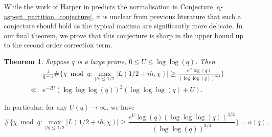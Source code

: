 \documentclass[10pt,a4paper]{amsart}
\newtheorem{theorem}{Theorem}
\numberwithin{equation}{section}
\begin{document}
While the work of Harper in \cite{harper2023typicalsizecharacterzeta} predicts the normalisation in Conjecture \ref{q-aspect_partition_conjecture}, it is unclear from previous literature that such a conjecture should hold as the typical maxima are significantly more delicate. In our final theorem, we prove that this conjecture is sharp in the upper bound up to the second order correction term.
\begin{theorem}
    Suppose $q$ is a large prime, $0 \leq U \leq \log\log(q)$. Then 
    \begin{align*}
        &\frac{1}{q-1}\#\big\{\chi \bmod{q}: \max_{|h| \leq 1/2}|L(1/2+ih,\chi)| \geq \frac{e^U\log(q)}{(\log\log(q))^{3/4}} \big\} \\ \ll& e^{-2U}(\log\log\log(q))^2(\log\log\log(q) + U).
    \end{align*}
    \label{short_range_max}
\end{theorem}
In particular, for any $U(q) \to \infty$, we have
$$\#\big\{\chi \bmod{q}: \max_{|h| \leq 1/2}|L(1/2+ih,\chi)| \geq \frac{e^U\log(q)(\log\log\log(q))^{3/2}}{(\log\log(q))^{3/4}}\big\} =o(q).$$
\end{document}
